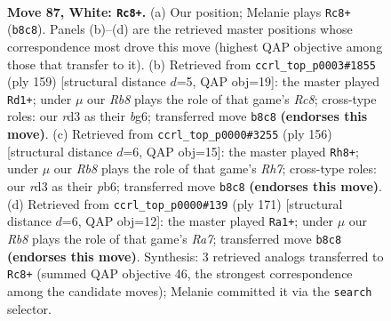 \documentclass[11pt]{article}
\begin{document}
\clearpage

\begin{figure}[p]\centering
\begin{subfigure}{0.46\textwidth}\centering
\resizebox{\linewidth}{!}{%
\newchessgame
\chessboard[
  setfen={1R6/8/8/2k3K1/r6P/3r4/8/8 w - - 15 87},
  showmover=false,
  pgfstyle=straightmove, color=movearrow, markmove={b8-c8}
]}
\caption{}
\end{subfigure}\hfill
\begin{subfigure}{0.46\textwidth}\centering
\resizebox{\linewidth}{!}{%
\newchessgame
\chessboard[
  setfen={6k1/R5p1/6B1/3K4/8/8/8/2r5 b - - 64 80},
  showmover=false,
  pgfstyle=straightmove, color=movearrow, markmove={c1-d1}
]}
\caption{}
\end{subfigure}
\\[4pt]
\begin{subfigure}{0.46\textwidth}\centering
\resizebox{\linewidth}{!}{%
\newchessgame
\chessboard[
  setfen={k7/7R/1p6/1P4r1/2K5/8/8/8 w - - 17 79},
  showmover=false,
  pgfstyle=straightmove, color=movearrow, markmove={h7-h8}
]}
\caption{}
\end{subfigure}\hfill
\begin{subfigure}{0.46\textwidth}\centering
\resizebox{\linewidth}{!}{%
\newchessgame
\chessboard[
  setfen={8/5R2/8/8/4k3/5p2/r7/5K2 b - - 5 86},
  showmover=false,
  pgfstyle=straightmove, color=movearrow, markmove={a2-a1}
]}
\caption{}
\end{subfigure}
\caption{\textbf{Move 87, White: \texttt{Rc8+}.} (a) Our position; Melanie plays \texttt{Rc8+} (\texttt{b8c8}). Panels (b)--(d) are the retrieved master positions whose correspondence most drove this move (highest QAP objective among those that transfer to it). (b) Retrieved from \texttt{ccrl\_top\_p0003\#1855} (ply 159) [structural distance $d$=5, QAP obj=19]: the master played \texttt{Rd1+}; under $\mu$ our \emph{Rb8} plays the role of that game's \emph{Rc8}; cross-type roles: our \emph{r}d3 as their \emph{b}g6; transferred move \texttt{b8c8} \textbf{(endorses this move)}. (c) Retrieved from \texttt{ccrl\_top\_p0000\#3255} (ply 156) [structural distance $d$=6, QAP obj=15]: the master played \texttt{Rh8+}; under $\mu$ our \emph{Rb8} plays the role of that game's \emph{Rh7}; cross-type roles: our \emph{r}d3 as their \emph{p}b6; transferred move \texttt{b8c8} \textbf{(endorses this move)}. (d) Retrieved from \texttt{ccrl\_top\_p0000\#139} (ply 171) [structural distance $d$=6, QAP obj=12]: the master played \texttt{Ra1+}; under $\mu$ our \emph{Rb8} plays the role of that game's \emph{Ra7}; transferred move \texttt{b8c8} \textbf{(endorses this move)}. Synthesis: 3 retrieved analogs transferred to \texttt{Rc8+} (summed QAP objective 46, the strongest correspondence among the candidate moves); Melanie committed it via the \texttt{search} selector.}
\label{fig:thought-m172}
\end{figure}
\end{document}
